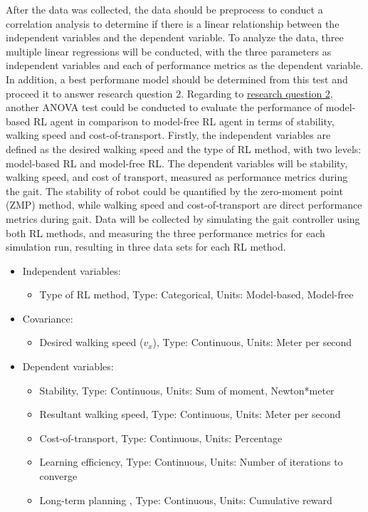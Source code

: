 After the data was collected, the data should be preprocess to conduct a correlation analysis to determine if there is a linear relationship between the independent variables and the dependent variable. To analyze the data, three multiple linear regressions will be conducted, with the three parameters as independent variables and each of performance metrics as the dependent variable. In addition, a best performane model should be determined from this test and proceed it to answer research question 2.
Regarding to \hyperref[rq2]{research question 2}, another ANOVA test could be conducted to evaluate the performance of model-based RL agent in comparison to model-free RL agent in terms of stability, walking speed and cost-of-transport. Firstly, the independent variables are defined as the desired walking speed and the type of RL method, with two levels: model-based RL and model-free RL. The dependent variables will be stability, walking speed, and cost of transport, measured as performance metrics during the gait. The stability of robot could be quantified by the zero-moment point (ZMP) method, while walking speed and cost-of-transport are direct performance metrics during gait. Data will be collected by simulating the gait controller using both RL methods, and measuring the three performance metrics for each simulation run, resulting in three data sets for each RL method. 
\begin{itemize}
    \item Independent variables: 
    \begin{itemize}
        \item Type of RL method, Type: Categorical, Units: Model-based, Model-free
    \end{itemize}
    \item Covariance:
    \begin{itemize}
        \item Desired walking speed ($v_x$), Type: Continuous, Units: Meter per second
    \end{itemize}
    \item Dependent variables:
    \begin{itemize}
        \item Stability, Type: Continuous, Units: Sum of moment, Newton*meter
        \item Resultant walking speed, Type: Continuous, Units: Meter per second
        \item Cost-of-transport, Type: Continuous, Units: Percentage
        \item Learning efficiency, Type: Continuous, Units: Number of iterations to converge
        \item Long-term planning , Type: Continuous, Units: Cumulative reward
    \end{itemize}
\end{itemize}
